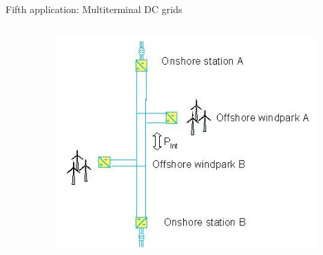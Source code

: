 \begin{frame}[allowframebreaks]{Fifth application: Multiterminal DC grids}
\begin{columns}
\begin{column}{0.5\linewidth}
\begin{itemize}
\end{itemize}
\end{column}
\begin{column}{0.5\linewidth}
\begin{center}
    \includegraphics[width=0.8\linewidth]{images/mtdc1.png}
\end{center}
\end{column}
\end{columns}
\end{frame}


